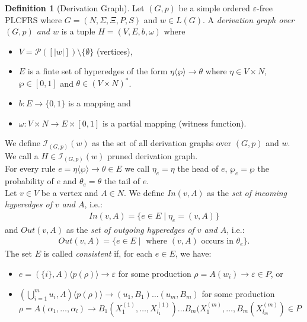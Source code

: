 \documentclass{tudscrartcl}
\theoremstyle{definition}
\newtheorem{definition}{Definition}[section]
\begin{document}
\begin{definition}[Derivation Graph]
	\label{def:dg}
	Let $(G, p)$ be a simple ordered $\varepsilon$-free PLCFRS
	where $G = (N, \Sigma, \Xi, P, S)$ and $w \in L(G)$.
	A \emph{derivation graph over $(G, p)$ and $w$} is a tuple $H = (V, E, b, \omega)$
	where
	\begin{itemize}
		\item $V = \mathcal{P}([|w|]) \setminus \{\emptyset\}$ (vertices),
		\item $E$ is a finte set of hyperedges of the form
			$\eta \langle \wp \rangle \to \theta$ where $\eta \in V \times N$,
			$\wp \in [0, 1]$ and $\theta \in (V \times N)^*$.
		\item $b: E \to \{0, 1\}$ is a mapping and
		\item $\omega: V \times N \to E \times [0, 1]$ is a partial mapping
			(witness function).
	\end{itemize}
	We define $\mathcal{I}_{(G, p)}(w)$ as the set of all derivation graphs
	over $(G, p)$ and $w$. We call a $H \in \mathcal{I}_{(G, p)}(w)$
	pruned derivation graph.\\
	For every rule $e = \eta\langle \wp \rangle \to \theta \in E$ we call
	$\eta_e = \eta$ the head of $e$, $\wp_e = \wp$ the probability of $e$ and
	$\theta_e = \theta$ the tail of $e$.\\
	Let $v \in V$ be a vertex and $A \in N$.
	We define $In(v, A)$ as the \emph{set of incoming hyperedges of $v$ and $A$}, i.e.:
	\begin{align*}
		In(v, A) = \{ e \in E
			\mid \eta_e = (v, A)\}
	\end{align*}
	and $Out(v, A)$ as the \emph{set of outgoing hyperedges of $v$ and $A$}, i.e.:
	\begin{align*}
		Out(v, A) = \{ e \in E
			\mid \text{ where $(v, A)$ occurs in $\theta_e$}\}.
	\end{align*}
	The set $E$ is called \emph{consistent} if, for each $e \in E$, we have:
	\begin{itemize}
		\item $e = (\{i\}, A)\langle p(\rho) \rangle \to \varepsilon$
			for some production $\rho = A(w_i) \to \varepsilon \in P$, or
		\item $(\bigcup_{i=1}^mu_i, A)\langle p(\rho) \rangle \to
			(u_1, B_1) \ldots (u_m, B_m)$ for some production\\
			$\rho = A(\alpha_1, \ldots, \alpha_l) \to B_1(X_1^{(1)}, \ldots, X_{l_1}^{(1)})
			\ldots B_m(X_1^{(m)}, \ldots, B_m(X_{l_m}^{(m)}) \in P$\\

\end{itemize}
\end{definition}
\end{document}

